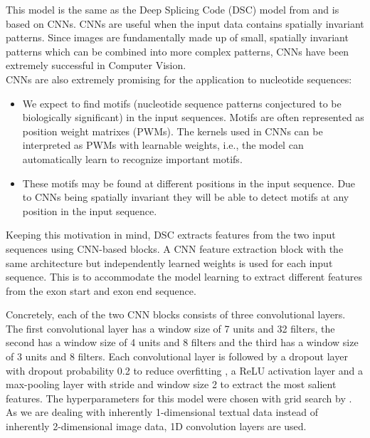 This model is the same as the Deep Splicing Code (DSC) model from \cite{dsc} and is based on CNNs.
CNNs are useful when the input data contains spatially invariant patterns.  Since images are fundamentally made up of small, spatially invariant patterns which can be combined into more complex patterns, CNNs have been extremely successful in Computer Vision.\\
CNNs are also extremely promising for the application to nucleotide sequences: 
\begin{itemize}
	\item We expect to find motifs (nucleotide sequence patterns conjectured to be biologically significant) in the input sequences. Motifs are often represented as position weight matrixes (PWMs). The kernels used in CNNs can be interpreted as PWMs with learnable weights, i.e., the model can automatically learn to recognize important motifs.
	\item These motifs may be found at different positions in the input sequence. Due to CNNs being spatially invariant they will be able to detect motifs at any position in the input sequence.
\end{itemize}

Keeping this motivation in mind, DSC extracts features from the two input sequences using CNN-based blocks. A CNN feature extraction block with the same architecture but independently learned weights is used for each input sequence. This is to accommodate the model learning to extract different features from the exon start and exon end sequence.

Concretely, each of the two CNN blocks consists of three convolutional layers. The first convolutional layer has a window size of 7 units and 32 filters, the second has a window size of 4 units and 8 filters and the third has a window size of 3 units and 8 filters. Each convolutional layer is followed by a dropout layer with dropout probability 0.2 to reduce overfitting \cite{dropout}, a ReLU activation layer \cite{relu} and a max-pooling layer with stride and window size 2 to extract the most salient features. The hyperparameters for this model were chosen with grid search by \cite{dsc}. As we are dealing with inherently 1-dimensional textual data instead of inherently 2-dimensional image data, 1D convolution layers are used.




